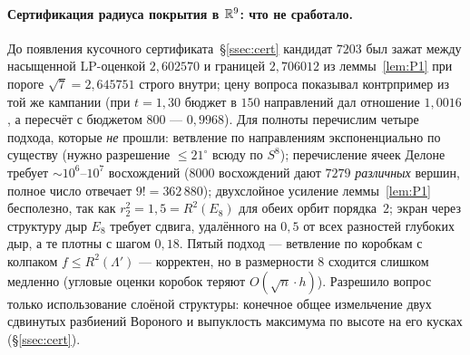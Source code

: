 \paragraph{Сертификация радиуса покрытия в $\mathbb{R}^9$: что не сработало.}
До появления кусочного сертификата~\S\ref{ssec:cert} кандидат $7203$ был
зажат между насыщенной LP-оценкой $2{,}602570$ и границей $2{,}706012$ из леммы~\ref{lem:P1}
при пороге $\sqrt7=2{,}645751$ строго внутри; цену вопроса показывал
контрпример из той же кампании (при $t=1{,}30$ бюджет в $150$ направлений дал
отношение $1{,}0016$, а пересчёт с бюджетом $800$ --- $0{,}9968$). Для полноты
перечислим четыре подхода, которые \emph{не} прошли: ветвление по направлениям
экспоненциально по существу (нужно разрешение $\le21^\circ$ всюду по $S^8$);
перечисление ячеек Делоне требует $\sim10^6$--$10^7$ восхождений ($8000$
восхождений дают $7279$ \emph{различных} вершин, полное число отвечает
$9!=362\,880$); двухслойное усиление леммы~\ref{lem:P1} бесполезно, так как
$r_2^2=1{,}5=R^2(E_8)$ для обеих орбит порядка~$2$; экран через структуру дыр
$E_8$ требует сдвига, удалённого на $0{,}5$ от всех разностей глубоких дыр, а
те плотны с шагом $0{,}18$. Пятый подход --- ветвление по коробкам с колпаком
$f\le R^2(\Lambda')$ --- корректен, но в размерности $8$ сходится слишком
медленно (угловые оценки коробок теряют $O(\sqrt n\cdot h)$). Разрешило
вопрос только использование слоёной структуры: конечное общее измельчение
двух сдвинутых разбиений Вороного и выпуклость максимума по высоте на его
кусках (\S\ref{ssec:cert}).
